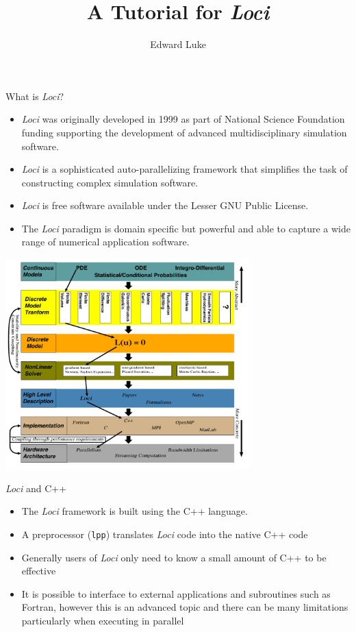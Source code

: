 \documentclass{beamer}
\title{A Tutorial for {\em Loci}}
\author{Edward Luke}
\begin{document}
\begin{frame}
\titlepage
\end{frame}

\begin{frame}{What is {\em Loci}?}
\begin{itemize}
\item {\em Loci} was originally developed in 1999 as part of National Science Foundation funding supporting the development of advanced multidisciplinary simulation software.
\item {\em Loci} is a sophisticated auto-parallelizing framework that simplifies the task of constructing complex simulation software.
\item {\em Loci} is free software available under the Lesser GNU Public License.
\item The {\em Loci} paradigm is domain specific but powerful and able to capture a wide range of numerical application software.
\end{itemize}
\end{frame}
\begin{frame}{}
\begin{center}
\includegraphics[height=3.2in]{Figures/architecture}
\end{center}
\end{frame}
\begin{frame}{{\em Loci} and C++}
\begin{itemize}
\item The {\em Loci} framework is built using the C++ language.
\item A preprocessor ({\tt lpp}) translates {\em Loci} code into the native C++ code
\item Generally users of {\it Loci} only need to know a small amount of C++ to be effective
\item It is possible to interface to external applications and subroutines such as Fortran, however this is an advanced topic and there can be many limitations particularly when executing in parallel
\end{itemize}
\end{frame}
\end{document}
